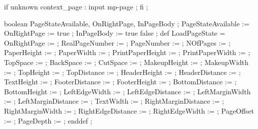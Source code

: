


\unprotect

\appendtoks
  if unknown context_page : input mp-page ; fi ;
\to \MPinitializations


  boolean PageStateAvailable, OnRightPage, InPageBody ; 
  PageStateAvailable := OnRightPage := true ;
  InPageBody         := \ifinpagebody true \else false \fi ; 
  def LoadPageState =
    OnRightPage         :=      \MPonrightpage ;
    RealPageNumber      :=  \the\realpageno ;
    PageNumber          :=  \the\pageno ;
    NOfPages            :=      \lastpage ;
    PaperHeight         :=  \the\papierhoogte ;
    PaperWidth          :=  \the\papierbreedte ;
    PrintPaperHeight    :=  \the\printpapierhoogte ;
    PrintPaperWidth     :=  \the\printpapierbreedte ;
    TopSpace            :=  \the\kopwit ;
    BackSpace           :=  \the\rugwit ;
    CutSpace            :=  \the\snijwit ;
    MakeupHeight        :=  \the\zethoogte ;
    MakeupWidth         :=  \the\zetbreedte ;
    TopHeight           :=  \the\bovenhoogte ;
    TopDistance         := \@the\bovenafstand ;
    HeaderHeight        :=  \the\hoofdhoogte ;
    HeaderDistance      := \@the\hoofdafstand ;
    TextHeight          :=  \the\teksthoogte ;
    FooterDistance      := \@the\voetafstand ;
    FooterHeight        :=  \the\voethoogte ;
    BottomDistance      := \@the\onderafstand ;
    BottomHeight        :=  \the\onderhoogte ;
    LeftEdgeWidth       :=  \the\linkerrandbreedte ;
    LeftEdgeDistance    := \@the\linkerrandafstand ;
    LeftMarginWidth     :=  \the\linkermargebreedte ;
    LeftMarginDistance  := \@the\linkermargeafstand ;
    TextWidth           :=  \the\tekstbreedte ;
    RightMarginDistance := \@the\rechtermargeafstand ;
    RightMarginWidth    :=  \the\rechtermargebreedte ;
    RightEdgeDistance   := \@the\rechterrandafstand ;
    RightEdgeWidth      :=  \the\rechterrandbreedte ;
    PageOffset          :=  \the\pageoffset ;
    PageDepth           :=  \the\pagedepth ;
  enddef ;
\stopuseMPgraphic

